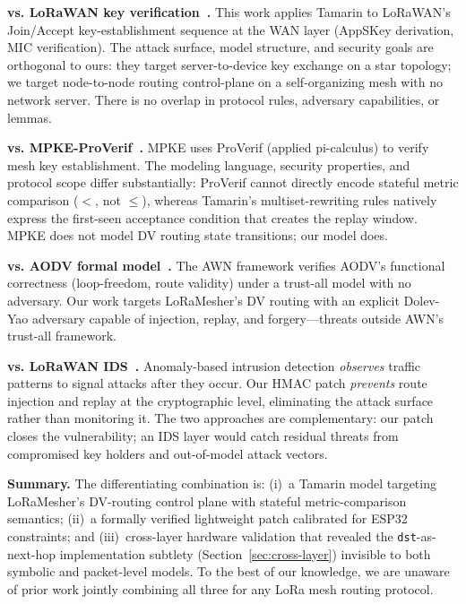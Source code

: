 \documentclass[preprint,12pt]{elsarticle}
\begin{document}
\textbf{vs. LoRaWAN key verification~\cite{ieee2025-lorawan-key-verification}.}
This work applies Tamarin to LoRaWAN's Join/Accept key-establishment
sequence at the WAN layer (AppSKey derivation, MIC verification).
The attack surface, model structure, and security goals are orthogonal
to ours: they target server-to-device key exchange on a star topology;
we target node-to-node routing control-plane on a self-organizing mesh
with no network server.
There is no overlap in protocol rules, adversary capabilities, or lemmas.

\textbf{vs. MPKE-ProVerif~\cite{ieee2025-mpke-proverif}.}
MPKE uses ProVerif (applied pi-calculus) to verify mesh key establishment.
The modeling language, security properties, and protocol scope differ substantially:
ProVerif cannot directly encode stateful metric comparison (\texttt{$<$},
not \texttt{$\leq$}), whereas Tamarin's multiset-rewriting rules
natively express the first-seen acceptance condition that creates the
replay window.
MPKE does not model DV routing state transitions; our model does.

\textbf{vs. AODV formal model~\cite{glabbeek2016-aodv-verification}.}
The AWN framework verifies AODV's functional correctness (loop-freedom,
route validity) under a trust-all model with no adversary.
Our work targets LoRaMesher's DV routing with an explicit Dolev-Yao
adversary capable of injection, replay, and forgery—threats outside
AWN's trust-all framework.

\textbf{vs. LoRaWAN IDS~\cite{bringye2026-lorawan-ids}.}
Anomaly-based intrusion detection \emph{observes} traffic patterns to
signal attacks after they occur.
Our HMAC patch \emph{prevents} route injection and replay at the
cryptographic level, eliminating the attack surface rather than
monitoring it.
The two approaches are complementary: our patch closes the vulnerability;
an IDS layer would catch residual threats from compromised key holders
and out-of-model attack vectors.

\textbf{Summary.}
The differentiating combination is: (i)~a Tamarin model targeting
LoRaMesher's DV-routing control plane with stateful metric-comparison
semantics; (ii)~a formally verified lightweight patch calibrated for
ESP32 constraints; and (iii)~cross-layer hardware validation that
revealed the \texttt{dst}-as-next-hop implementation subtlety
(Section~\ref{sec:cross-layer}) invisible to both symbolic
and packet-level models.
To the best of our knowledge, we are unaware of prior work jointly
combining all three for any LoRa mesh routing protocol.
\end{document}
